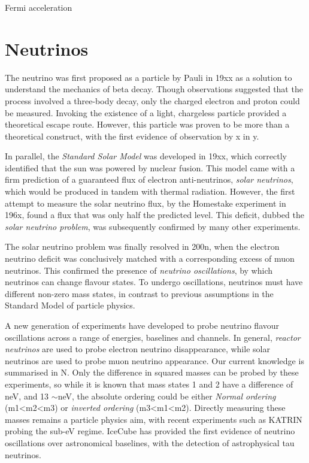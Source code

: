 Fermi acceleration

\section{Neutrinos}

The neutrino was first proposed as a particle by Pauli in 19xx as a solution to understand the mechanics of beta decay. Though observations suggested that the process involved a three-body decay, only the charged electron and proton could be measured. Invoking the existence of a light, chargeless particle provided a theoretical escape route. However, this particle was proven to be more than a theoretical construct, with the first evidence of observation by x in y.

In parallel, the \emph{Standard Solar Model} was developed in 19xx, which correctly identified that the sun was powered by nuclear fusion. This model came with a firm prediction of a guaranteed flux of electron anti-neutrinos, \emph{solar neutrinos}, which would be produced in tandem with thermal radiation. However, the first attempt to measure the solar neutrino flux, by the Homestake experiment in 196x, found a flux that was only half the predicted level. This deficit, dubbed the \emph{solar neutrino problem}, was subsequently confirmed by many other experiments.

The solar neutrino problem was finally resolved in 200n, when the electron neutrino deficit was conclusively matched with a corresponding excess of muon neutrinos. This confirmed the presence of \emph{neutrino oscillations}, by which neutrinos can change flavour states. To undergo oscillations, neutrinos must have different non-zero mass states, in contrast to previous assumptions in the Standard Model of particle physics. 

A new generation of experiments have developed to probe neutrino flavour oscillations across a range of energies, baselines and channels. In general, \emph{reactor neutrinos} are used to probe electron neutrino disappearance, while solar neutrinos are used to probe muon neutrino appearance. Our current knowledge is summarised in N. Only the difference in squared masses can be probed by these experiments, so while it is known that mass states 1 and 2 have a difference of neV, and 13 $\sim$neV, the absolute ordering could be either \emph{Normal ordering} (m1<m2<m3) or \emph{inverted ordering} (m3<m1<m2). Directly measuring these masses remains a particle physics aim, with recent experiments such as KATRIN probing the sub-eV regime. IceCube has provided the first evidence of neutrino oscillations over astronomical baselines, with the detection of astrophysical tau neutrinos.

